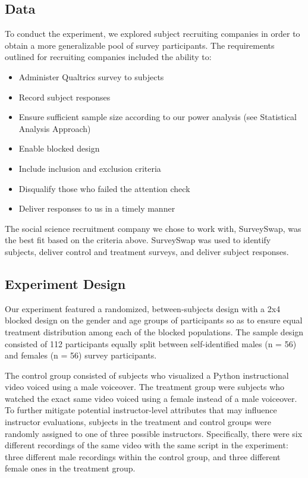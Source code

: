 \documentclass[
]{article}
\providecommand{\tightlist}{%
  \setlength{\itemsep}{0pt}\setlength{\parskip}{0pt}}
\begin{document}
\hypertarget{data}{%
\subsection{Data}\label{data}}

To conduct the experiment, we explored subject recruiting companies in
order to obtain a more generalizable pool of survey participants. The
requirements outlined for recruiting companies included the ability to:

\begin{itemize}
\tightlist
\item
  Administer Qualtrics survey to subjects
\item
  Record subject responses
\item
  Ensure sufficient sample size according to our power analysis (see
  Statistical Analysis Approach)
\item
  Enable blocked design
\item
  Include inclusion and exclusion criteria
\item
  Disqualify those who failed the attention check
\item
  Deliver responses to us in a timely manner
\end{itemize}

The social science recruitment company we chose to work with,
SurveySwap, was the best fit based on the criteria above. SurveySwap was
used to identify subjects, deliver control and treatment surveys, and
deliver subject responses.

\hypertarget{experiment-design}{%
\subsection{Experiment Design}\label{experiment-design}}

Our experiment featured a randomized, between-subjects design with a 2x4
blocked design on the gender and age groups of participants so as to
ensure equal treatment distribution among each of the blocked
populations. The sample design consisted of 112 participants equally
split between self-identified males (n = 56) and females (n = 56) survey
participants.

The control group consisted of subjects who visualized a Python
instructional video voiced using a male voiceover. The treatment group
were subjects who watched the exact same video voiced using a female
instead of a male voiceover. To further mitigate potential
instructor-level attributes that may influence instructor evaluations,
subjects in the treatment and control groups were randomly assigned to
one of three possible instructors. Specifically, there were six
different recordings of the same video with the same script in the
experiment: three different male recordings within the control group,
and three different female ones in the treatment group.
\end{document}
